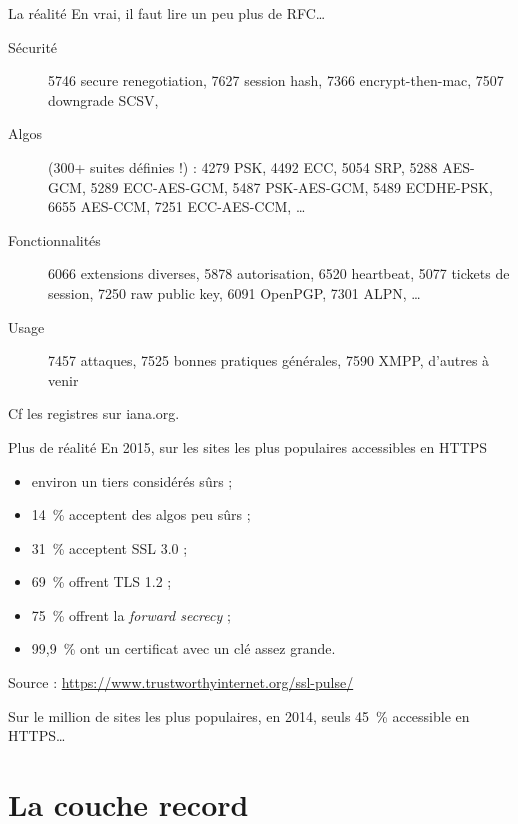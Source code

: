 \documentclass{mpg-ep-slides}
\begin{document}
\begin{frame}{La réalité}
  En vrai, il faut lire un peu plus de RFC\dots

  \begin{description}
    \item[Sécurité] 5746 secure renegotiation, 7627 session hash, 7366
      encrypt-then-mac, 7507 downgrade SCSV,
    \item[Algos] (300+ suites définies !) : 4279 PSK, 4492 ECC, 5054 SRP, 5288
      AES-GCM, 5289 ECC-AES-GCM, 5487 PSK-AES-GCM, 5489 ECDHE-PSK, 6655
      AES-CCM, 7251 ECC-AES-CCM, \dots
    \item[Fonctionnalités] 6066 extensions diverses, 5878 autorisation, 6520
      heartbeat, 5077 tickets de session, 7250 raw public key, 6091 OpenPGP,
      7301 ALPN, \dots
    \item[Usage] 7457 attaques, 7525 bonnes pratiques générales, 7590 XMPP,
      d'autres à venir
  \end{description}

  Cf les registres sur iana.org.
\end{frame}

\begin{frame}{Plus de réalité}
  En 2015, sur les sites les plus populaires accessibles en HTTPS
  \begin{itemize}
    \item environ un tiers considérés sûrs ;
    \item 14~\% acceptent des algos peu sûrs ;
    \item 31~\% acceptent SSL 3.0 ;
    \item 69~\% offrent TLS 1.2 ;
    \item 75~\% offrent la \emph{forward secrecy} ;
    \item 99,9~\% ont un certificat avec un clé assez grande.
  \end{itemize}

  Source : \url{https://www.trustworthyinternet.org/ssl-pulse/}

  \medskip

  Sur le million de sites les plus populaires, en 2014, seuls 45~\%
  accessible en HTTPS\dots
\end{frame}


\section[Couche record]{La couche record}
\tocsect
\end{document}
